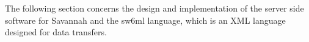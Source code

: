 The following section concerns the design and implementation of the server side software for Savannah and the sw6ml language, 
which is an XML language designed for data transfers.